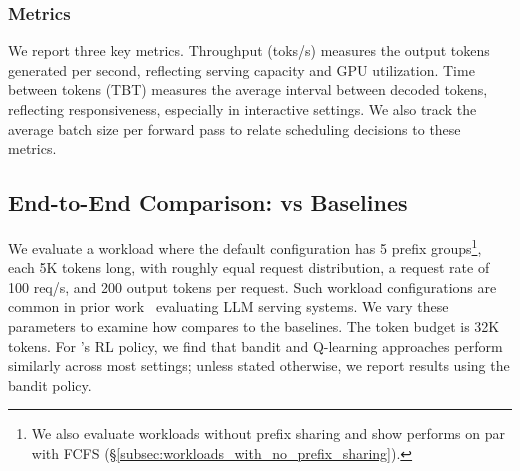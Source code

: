 \vspace{-5pt}

\subsubsection*{Metrics}
We report three key metrics. Throughput (toks/s) measures the output tokens generated per second, reflecting serving capacity and GPU utilization. Time between tokens (TBT) measures the average interval between decoded tokens, reflecting responsiveness, especially in interactive settings. We also track the average batch size per forward pass to relate scheduling decisions to these metrics.

\vspace{-4pt}

\subsection{End-to-End Comparison: \Feather vs Baselines}
We evaluate a workload where the default configuration has 5 prefix groups\footnote{We also evaluate workloads without prefix sharing and show \Feather performs on par with FCFS (\S\ref{subsec:workloads_with_no_prefix_sharing}).}, each 5K tokens long, with roughly equal request distribution, a request rate of 100 req/s, and 200 output tokens per request. Such workload configurations are common in prior work~\cite{yi2026pat,MLSYS2025_96894468} evaluating LLM serving systems. We vary these parameters to examine how \Feather compares to the baselines. The token budget is 32K tokens. For \Feather's RL policy, we find that bandit and Q-learning approaches perform similarly across most settings; unless stated otherwise, we report results using the bandit policy. 

\vspace{-5pt}

